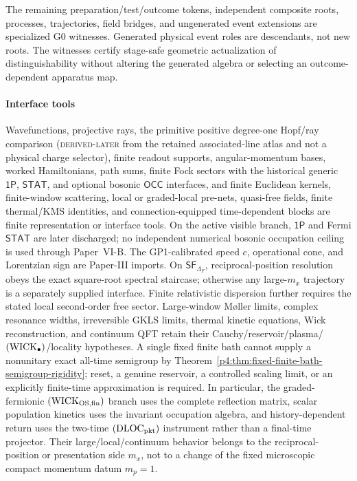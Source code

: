 \documentclass[12pt,a4paper]{article}
\begin{document}
The remaining preparation/test/outcome tokens, independent composite roots,
processes, trajectories, field bridges, and ungenerated event extensions are
specialized G0 witnesses.  Generated physical event roles are descendants,
not new roots.  The witnesses certify stage-safe geometric actualization of
distinguishability without
altering the generated algebra or selecting an outcome-dependent apparatus
map.



\paragraph{Interface tools}
\label{p4:sec:conclusion-representation-bridge}

Wavefunctions, projective rays, the primitive positive degree-one
Hopf/ray comparison (\textsc{derived-later} from the retained associated-line
atlas and not a physical charge selector), finite readout supports,
angular-momentum bases, worked Hamiltonians, path sums, finite Fock sectors
with the historical generic \(\mathsf{1P}\), \(\mathsf{STAT}\), and optional
bosonic \(\mathsf{OCC}\) interfaces, and finite Euclidean kernels,
finite-window
scattering, local or graded-local pre-nets, quasi-free fields, finite thermal/KMS identities,
and connection-equipped time-dependent blocks are finite representation or
interface tools.  On the active visible branch, \(\mathsf{1P}\) and Fermi
\(\mathsf{STAT}\) are later discharged; no independent numerical bosonic
occupation ceiling is used through Paper~VI-B.  The GP1-calibrated speed \(c\),
operational cone, and
Lorentzian sign are Paper-III imports.  On
\(\mathsf{SF}_{\Lambda_F}\), reciprocal-position resolution obeys the exact
square-root spectral staircase; otherwise any large-\(m_x\) trajectory is a
separately supplied interface.  Finite relativistic dispersion further
requires the stated local second-order free sector.  Large-window M\o ller
limits, complex resonance widths, irreversible GKLS limits, thermal kinetic
equations, Wick reconstruction, and continuum QFT retain their
Cauchy/reservoir/plasma/\(({\rm WICK}_\bullet)\)/locality hypotheses.  A
single fixed finite bath cannot supply a nonunitary exact all-time semigroup
by Theorem~\ref{p4:thm:fixed-finite-bath-semigroup-rigidity}; reset, a
genuine reservoir, a controlled scaling limit, or an explicitly finite-time
approximation is required.  In particular,
the graded-fermionic \(({\rm WICK}_{\rm OS,fin})\) branch uses the complete reflection
matrix, scalar population kinetics uses the invariant occupation algebra, and
history-dependent return uses the two-time
\((\mathrm{DLOC}_{\rm pkt})\) instrument rather than a final-time projector.  Their
large/local/continuum behavior belongs to the reciprocal-position or
presentation side \(m_x\), not to a change of the fixed microscopic compact
momentum datum \(m_p=1\).
\end{document}
